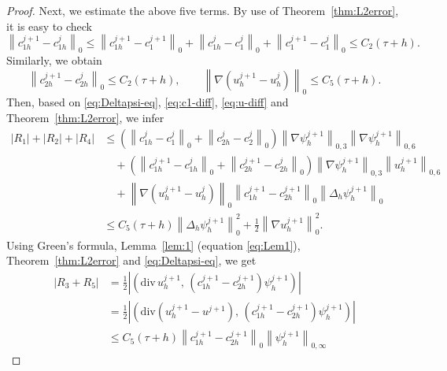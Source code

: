 \begin{proof}
Next, we estimate the above five terms. By use of Theorem~\ref{thm:L2error}, it is easy to check
\begin{equation}
  \left\|c_{1h}^{j+1} - c_{1h}^{j}\right\|_{0}
  \leq
  \left\|c_{1h}^{j+1} - c_{1}^{j+1}\right\|_{0}
  + \left\|c_{1h}^{j} - c_{1}^{j}\right\|_{0}
  + \left\|c_{1}^{j+1} - c_{1}^{j}\right\|_{0}
  \leq C_{2}(\tau + h).
  \label{eq:c1-diff}
\end{equation}
Similarly, we obtain
\begin{equation}
  \left\|c_{2h}^{j+1} - c_{2h}^{j}\right\|_{0}
  \leq C_{2}(\tau + h),
  \qquad
  \left\|\nabla\!\left(u_{h}^{j+1} - u_{h}^{j}\right)\right\|_{0}
  \leq C_{5}(\tau + h).
  \label{eq:u-diff}
\end{equation}
Then, based on \eqref{eq:Deltapsi-eq}, \eqref{eq:c1-diff}, \eqref{eq:u-diff} and
Theorem~\ref{thm:L2error}, we infer
\begin{align}
  |R_{1}| + |R_{2}| + |R_{4}|
  &\leq
  \left(\left\|c_{1h}^{j} - c_{1}^{j}\right\|_{0}
        + \left\|c_{2h}^{j} - c_{2}^{j}\right\|_{0}\right)
  \left\|\nabla\psi_{h}^{j+1}\right\|_{0,3}
  \left\|\nabla\psi_{h}^{j+1}\right\|_{0,6}
  \nonumber\\
  &\quad
  + \left(\left\|c_{1h}^{j+1} - c_{1h}^{j}\right\|_{0}
          + \left\|c_{2h}^{j+1} - c_{2h}^{j}\right\|_{0}\right)
  \left\|\nabla\psi_{h}^{j+1}\right\|_{0,3}
  \left\|u_{h}^{j+1}\right\|_{0,6}
  \nonumber\\
  &\quad
  + \left\|\nabla\!\left(u_{h}^{j+1} - u_{h}^{j}\right)\right\|_{0}
  \left\|c_{1h}^{j+1} - c_{2h}^{j+1}\right\|_{0}
  \left\|\Delta_{h}\psi_{h}^{j+1}\right\|_{0}
  \nonumber\\
  &\leq
  C_{5}(\tau + h)\left\|\Delta_{h}\psi_{h}^{j+1}\right\|_{0}^{2}
  + \frac{1}{2}\left\|\nabla u_{h}^{j+1}\right\|_{0}^{2}.
  \label{eq:R1R2R4}
\end{align}
Using Green's formula, Lemma~\ref{lem:1} (equation \eqref{eq:Lem1}), Theorem~\ref{thm:L2error}
and \eqref{eq:Deltapsi-eq}, we get
\begin{align}
  |R_{3} + R_{5}|
  &= \frac{1}{2}
     \left|\left(\mathrm{div}\,u_{h}^{j+1},\,
                 (c_{1h}^{j+1} - c_{2h}^{j+1})\psi_{h}^{j+1}\right)\right|
  \nonumber\\
  &= \frac{1}{2}
     \left|\left(\mathrm{div}(u_{h}^{j+1} - u^{j+1}),\,
                 (c_{1h}^{j+1} - c_{2h}^{j+1})\psi_{h}^{j+1}\right)\right|
  \nonumber\\
  &\leq
  C_{5}(\tau + h)
  \left\|c_{1h}^{j+1} - c_{2h}^{j+1}\right\|_{0}
  \left\|\psi_{h}^{j+1}\right\|_{0,\infty}

\end{align}
\end{proof}

